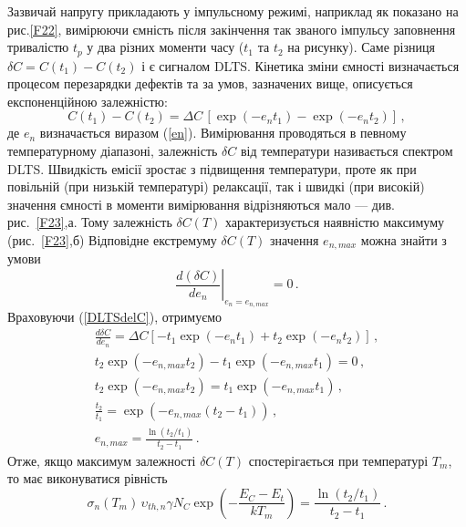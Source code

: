 \documentclass[10pt,a5paper,titlepage,oneside]{book}
\numberwithin{equation}{part}
\begin{document}
Зазвичай напругу прикладають у імпульсному режимі, наприклад як показано на рис.\ref{F22},
вимірюючи ємність після закінчення так званого імпульсу заповнення тривалістю $t_p$
у два різних моменти часу ($t_1$ та $t_2$ на рисунку).
Саме різниця $\delta C=C(t_1)-C(t_2)$ і є сигналом DLTS.
Кінетика зміни ємності визначається процесом перезарядки дефектів
та за умов, зазначених вище, описується експоненційною залежністю:
\begin{equation}
\label{DLTSdelC}
C(t_1)-C(t_2)=\Delta C\,\left[\exp(-e_n t_1)-\exp(-e_n t_2)\right]\,,
\end{equation}
де
$e_n$ визначається виразом (\ref{en}).
Вимірювання проводяться в певному температурному діапазоні, залежність
$\delta C$ від температури називається спектром DLTS.
Швидкість емісії зростає з підвищення температури,
проте як при повільній (при низькій температурі) релаксації,
так і швидкі (при високій)
значення ємності в моменти вимірювання відрізняються мало --- див. рис.~\ref{F23},а.
Тому залежність $\delta C(T)$
характеризується наявністю максимуму (рис.~\ref{F23},б)
Відповідне екстремуму $\delta C(T)$ значення $e_{n,max}$ можна знайти з умови
\begin{equation*}
\left.\frac{d(\delta C)}{d e_n}\right|_{e_n=e_{n,max}}=0\,.
\end{equation*}
Враховуючи (\ref{DLTSdelC}), отримуємо
\begin{gather}
  \frac{d\delta C}{d e_n} = \Delta C \left[-t_1\exp(-e_n t_1)+t_2\exp(-e_n t_2)\right]\,, \nonumber\\
  t_2\exp(-e_{n,max} t_2)-t_1\exp(-e_{n,max} t_1)= 0\,,\nonumber\\
  t_2\exp(-e_{n,max} t_2)= t_1\exp(-e_{n,max} t_1)\,, \nonumber\\
  \frac{t_2}{t_1} = \exp(-e_{n,max} (t_2-t_1))\,, \nonumber\\
  e_{n,max}=\frac{\ln\left(t_2/t_1\right)}{t_2-t_1}\,.\label{DLTSemax}
\end{gather}
Отже, якщо максимум залежності $\delta C(T)$ спостерігається при температурі $T_m$,
то має виконуватися рівність
\begin{equation}
\label{DLTSTmax}
\sigma_n(T_m)\,\upsilon_{th,n}\gamma N_C \exp\left(-\frac{E_C-E_t}{kT_m}\right)=\frac{\ln\left(t_2/t_1\right)}{t_2-t_1}\,.
\end{equation}
\end{document}
